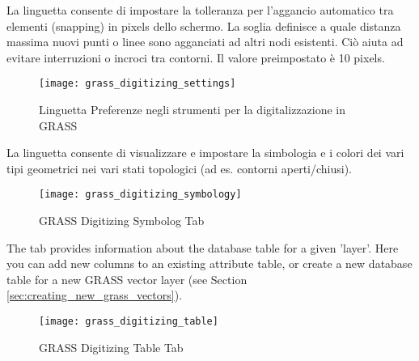 \label{label_settingtab}

La linguetta  consente di impostare la tolleranza per
l'aggancio automatico tra elementi (snapping) in pixels dello schermo. La
soglia definisce a quale distanza massima nuovi punti o linee sono agganciati
ad altri nodi esistenti. Ciò aiuta ad evitare interruzioni o incroci tra
contorni. Il valore preimpostato è 10 pixels.

\begin{figure}[h]
 \begin{center}
 \caption{Linguetta Preferenze negli strumenti per la digitalizzazione in GRASS \nixcaption}\label{fig:grass_digitizing_settings}
 \texttt{[image: grass\_digitizing\_settings]}
 \end{center}
\end{figure}


La linguetta  consente di visualizzare e impostare la
simbologia e i colori dei vari tipi geometrici nei vari stati topologici (ad
es. contorni aperti/chiusi).

\begin{figure}[h]
 \begin{center}
 \caption{GRASS Digitizing Symbolog Tab \nixcaption}\label{fig:grass_digitizing_symbology}
 \texttt{[image: grass\_digitizing\_symbology]}
 \end{center}
\end{figure}

 

The  tab provides information about the database table for
a given 'layer'. Here you can add new columns to an existing attribute table,
or create a new database table for a new GRASS vector layer (see Section 
\ref{sec:creating_new_grass_vectors}).

\begin{figure}[h]
 \begin{center}
 \caption{GRASS Digitizing Table Tab \nixcaption}\label{fig:grass_digitizing_table}
 \texttt{[image: grass\_digitizing\_table]}
 \end{center}
\end{figure}

\begin{Tip}\caption{\textsc{GRASS Edit Permissions}}
\end{Tip} 

